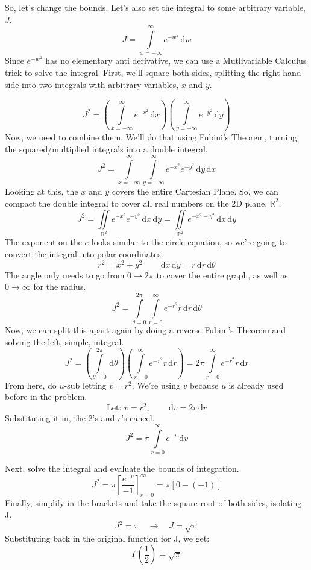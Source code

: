 \documentclass{article}
\newcommand{\dx}{\,\mathrm{d}x}
\newcommand{\dv}{\, \mathrm{d}v}
\newcommand{\dw}{\, \mathrm{d}w}
\newcommand{\dy}{\, \mathrm{d}y}
\newcommand{\dr}{\, \mathrm{d}r}
\newcommand{\dtheta}{\, \mathrm{d}\theta}
\let\oldint\int
\renewcommand{\int}{\oldint\limits}
\newcounter{problem}
\begin{document}
	
	\noindent So, let's change the bounds. Let's also set the integral to some arbitrary variable, $J$.
	\[
	\displaystyle{J = \int_{w = -\infty}^{\infty} e^{-w^2} \dw}
	\]
	\noindent Since $e^{-w^2}$ has no elementary anti derivative, we can use a Mutlivariable Calculus trick to solve the integral. First, we'll square both sides, splitting the right hand side into two integrals with arbitrary variables, $x$ and $y$.
	
	\[
	\displaystyle{J^2 = \left(\int_{x=-\infty}^{\infty}e^{-x^2} \dx\right)\left(\int_{y=-\infty}^{\infty}e^{-y^2}\dy\right)}
	\]
	\noindent Now, we need to combine them. We'll do that using Fubini's Theorem, turning the squared/multiplied integrals into a double integral.
	\[
	J^2 = \int_{x=-\infty}^{\infty}\int_{y=-\infty}^{\infty}e^{-x^2}e^{-y^2}\dy\dx
	\]
	\noindent Looking at this, the $x$ and $y$ covers the entire Cartesian Plane. So, we can compact the double integral to cover all real numbers on the 2D plane, $\mathbb{R}^2$.
	\[
	\displaystyle{
		J^2=\iint\limits_{\mathbb{R}^2}e^{-x^2}e^{-y^2}\dx\dy = \iint\limits_{\mathbb{R}^2}e^{-x^2-y^2}\dx\dy
	}
	\]
	\noindent The exponent on the $e$ looks similar to the circle equation, so we're going to convert the integral into polar coordinates.
	\[
	\displaystyle{
		r^2 = x^2 + y^2 \qquad \dx\dy = r\dr\dtheta
	}
	\]
	\noindent The angle only needs to go from $0 \rightarrow 2\pi$ to cover the entire graph, as well as $0 \rightarrow \infty$ for the radius.
	\[
	\displaystyle{
		J^2 = \int_{\theta=0}^{2\pi}\int_{r=0}^{\infty}e^{-r^2}r\dr\dtheta
	}
	\]
	\noindent Now, we can split this apart again by doing a reverse Fubini's Theorem and solving the left, simple, integral.
	\[
	\displaystyle{
	J^2 = \left(\int_{\theta=0}^{2\pi}\dtheta\right)\left(\int_{r=0}^{\infty}e^{-r^2}r\dr\right) = 2\pi\int_{r=0}^{\infty}e^{-r^2}r\dr
	}
	\]
	\noindent From here, do $u$-sub letting $v=r^2$. We're using $v$ because $u$ is already used before in the problem.
	\[
	\displaystyle{
		\text{Let: } v = r^2, \qquad \dv = 2r\dr
	}
	\]
	\noindent Substituting it in, the $2$'s and $r$'s cancel.
	\[
	\displaystyle{
		J^2 = \pi\int_{r=0}^{\infty}e^{-v}\dv
	}
	\]
	
	
	\noindent Next, solve the integral and evaluate the bounds of integration.
	\[
	\displaystyle{
		J^2 = \pi\left[\frac{e^{-v}}{-1}\right]_{r=0}^{\infty} = \pi\left[0-(-1)\right]
	}
	\]
	\noindent Finally, simplify in the brackets and take the square root of both sides, isolating J.
	\[
	\displaystyle{
		J^2 = \pi \quad \rightarrow \quad J = \sqrt{\pi}
	}
	\]
	\noindent Substituting back in the original function for J, we get:
	\[
	\displaystyle{
		\boxed{\Gamma{\left(\frac{1}{2}\right)} = \sqrt{\pi}}
	}
	\]\\ [10pt]
	
\end{document}
